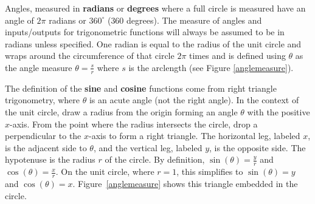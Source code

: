\medskip

Angles, measured in \textbf{radians} or \textbf{degrees} where a full circle is measured have an angle of $2\pi$ radians or $360^\circ$ ($360$ degrees). The measure of angles and inputs/outputs for trigonometric functions will always be assumed to be in radians unless specified. One radian is equal to the radius of the unit circle and wraps around the circumference of that circle $2\pi$ times and is defined using $\theta$ as the angle measure $\theta = \frac{s}{r}$ where $s$ is the arclength (see Figure \ref{anglemeasure}).

\medskip

The definition of the \textbf{sine} and \textbf{cosine} functions come from right triangle trigonometry, where $\theta$ is an acute angle (not the right angle). In the context of the unit circle, draw a radius from the origin forming an angle $\theta$ with the positive $x$-axis. From the point where the radius intersects the circle, drop a perpendicular to the $x$-axis to form a right triangle. The horizontal leg, labeled $x$, is the adjacent side to $\theta$, and the vertical leg, labeled $y$, is the opposite side. The hypotenuse is the radius $r$ of the circle. By definition, $\sin(\theta) = \frac{y}{r}$ and $\cos(\theta) = \frac{x}{r}$. On the unit circle, where $r = 1$, this simplifies to $\sin(\theta) = y$ and $\cos(\theta) = x$. Figure~\ref{anglemeasure} shows this triangle embedded in the circle.

\medskip

